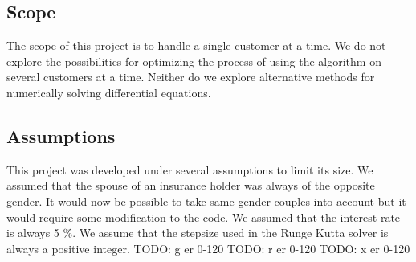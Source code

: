 \subsection{Scope}
	The scope of this project is to handle a single customer at a time. We do not explore the possibilities for optimizing the process of using the algorithm on several customers at a time. Neither do we explore alternative methods for numerically solving differential equations.
	
\subsection{Assumptions}
This project was developed under several assumptions to limit its size. We assumed that the spouse of an insurance holder was always of the opposite gender. It would now be possible to take same-gender couples into account but it would require some modification to the code. We assumed that the  interest rate is always 5 \%. We assume that the stepsize used in the Runge Kutta solver is always a positive integer. 
TODO: g er 0-120
TODO: r er 0-120
TODO: x er 0-120


